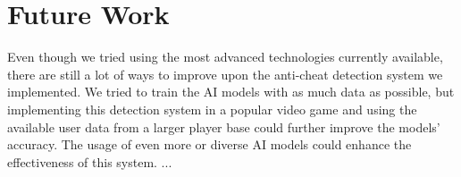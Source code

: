 \section{Future Work}
\label{ch:future}

Even though we tried using the most advanced technologies currently available, there are still a lot of ways to improve upon the anti-cheat detection system we implemented.
We tried to train the AI models with as much data as possible, but implementing this detection system in a popular video game and using the available user data from a larger player base could further improve the models’ accuracy.
The usage of even more or diverse AI models could enhance the effectiveness of this system.
...